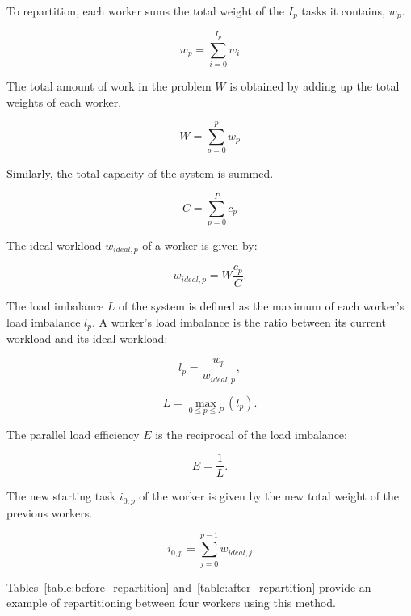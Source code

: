 To repartition, each worker sums the total weight of the \(I_p\) tasks it contains, \(w_p\).

\begin{equation}
	w_p = \sum_{i = 0}^{I_p}w_i
\end{equation}

\noindent
The total amount of work in the problem \(W\) is obtained by adding up the total weights of each
worker.

\begin{equation}
	W = \sum_{p = 0}^{p}w_p
\end{equation}

\noindent
Similarly, the total capacity of the system is summed.

\begin{equation}
	C = \sum_{p = 0}^{P}c_p
\end{equation}

\noindent
The ideal workload \(w_{ideal,p}\) of a worker is given by:

\begin{equation}
	w_{ideal,p} = W \frac{c_p}{C}.
\end{equation}

The load imbalance \(L\) of the system is defined as the maximum of each worker's load imbalance
\(l_p\). A worker's load imbalance is the ratio between its current workload and its ideal workload:

\begin{equation}
	l_{p} = \frac{w_p}{w_{ideal,p}},
\end{equation}

\begin{equation} \label{equ:load_imbalance}
	L = \max_{0 \leq p \leq P}{(l_{p})}.
\end{equation}

\noindent
The parallel load efficiency \(E\) is the reciprocal of the load imbalance:

\begin{equation}
	E = \frac{1}{L}.
\end{equation}

The new starting task \(i_{0, p}\) of the worker is given by the new total weight of the previous
workers.

\begin{equation}
	i_{0, p} = \sum_{j = 0}^{p - 1}w_{ideal,j}
\end{equation}

Tables~\ref{table:before_repartition} and~\ref{table:after_repartition} provide an example of
repartitioning between four workers using this method.

